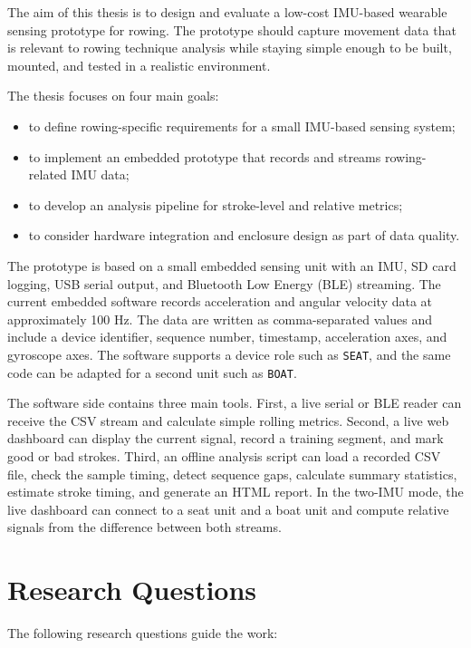 The aim of this thesis is to design and evaluate a low-cost IMU-based wearable sensing prototype for rowing. The prototype should capture movement data that is relevant to rowing technique analysis while staying simple enough to be built, mounted, and tested in a realistic environment.

The thesis focuses on four main goals:

\begin{itemize}
  \item to define rowing-specific requirements for a small IMU-based sensing system;
  \item to implement an embedded prototype that records and streams rowing-related IMU data;
  \item to develop an analysis pipeline for stroke-level and relative metrics;
  \item to consider hardware integration and enclosure design as part of data quality.
\end{itemize}

The prototype is based on a small embedded sensing unit with an IMU, SD card logging, USB serial output, and Bluetooth Low Energy (BLE) streaming. The current embedded software records acceleration and angular velocity data at approximately 100 Hz. The data are written as comma-separated values and include a device identifier, sequence number, timestamp, acceleration axes, and gyroscope axes. The software supports a device role such as \texttt{SEAT}, and the same code can be adapted for a second unit such as \texttt{BOAT}.

The software side contains three main tools. First, a live serial or BLE reader can receive the CSV stream and calculate simple rolling metrics. Second, a live web dashboard can display the current signal, record a training segment, and mark good or bad strokes. Third, an offline analysis script can load a recorded CSV file, check the sample timing, detect sequence gaps, calculate summary statistics, estimate stroke timing, and generate an HTML report. In the two-IMU mode, the live dashboard can connect to a seat unit and a boat unit and compute relative signals from the difference between both streams.

\section{Research Questions}

The following research questions guide the work:


